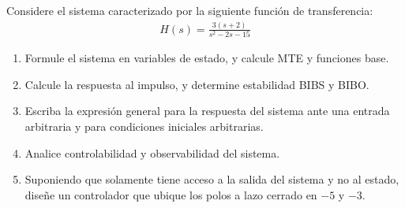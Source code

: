 \documentclass[
  11pt,
  letterpaper,
   addpoints,
   answers
  ]{exam}
\begin{document}
\begin{questions}
    \question Considere el sistema caracterizado por la siguiente función de transferencia:
    \begin{align}
    H(s) = \frac{3(s + 2)}{s^2 - 2s - 15}
    \end{align}
    \begin{enumerate}
        \item Formule el sistema en variables de estado, y calcule MTE y funciones base.
        \item Calcule la respuesta al impulso, y determine estabilidad BIBS y BIBO.
        \item Escriba la expresión general para la respuesta del sistema ante una entrada arbitraria y para condiciones iniciales arbitrarias.
        \item Analice controlabilidad y observabilidad del sistema.
        \item Suponiendo que solamente tiene acceso a la salida del sistema y no al estado, diseñe un controlador que ubique los polos a lazo cerrado en $-5$ y $-3$.
    \end{enumerate}
    \begin{solution}

\end{solution}
\end{questions}
\end{document}
